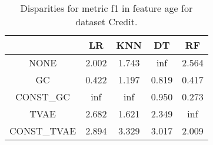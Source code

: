 \begin{table}
\caption{Disparities for metric f1 in feature age for dataset Credit.}
\label{tab:disp-CREDIT-age-f1}
\begin{tabular}{ccccc}
\toprule
 & LR & KNN & DT & RF \\
\midrule
NONE & 2.002 & 1.743 & inf & 2.564 \\
GC & 0.422 & 1.197 & 0.819 & 0.417 \\
CONST\_GC & inf & inf & 0.950 & 0.273 \\
TVAE & 2.682 & 1.621 & 2.349 & inf \\
CONST\_TVAE & 2.894 & 3.329 & 3.017 & 2.009 \\
\bottomrule
\end{tabular}
\end{table}
